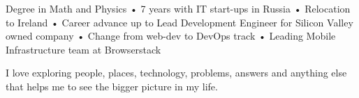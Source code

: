 

\begin{cvparagraph}

Degree in Math and Physics • 7 years with IT start-ups in Russia • Relocation to Ireland • Career advance up to Lead Development Engineer for Silicon Valley owned company • Change from web-dev to DevOps track • Leading Mobile Infrastructure team at Browserstack

I love exploring people, places, technology, problems, answers and anything else that helps me to see the bigger picture in my life.

\end{cvparagraph}
